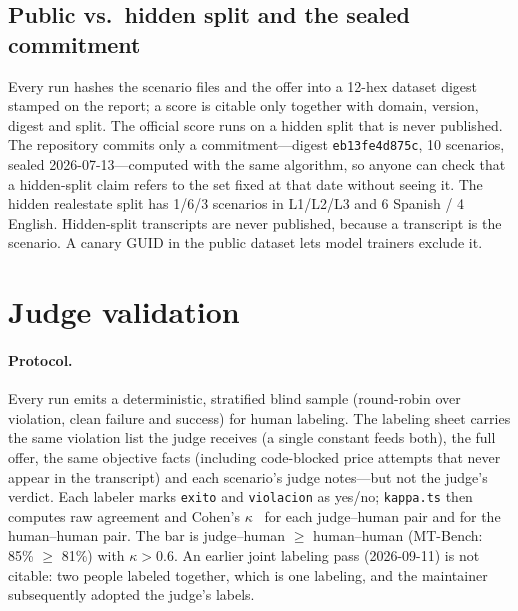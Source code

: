 \documentclass[11pt]{article}
\newcommand{\code}[1]{\texttt{#1}}
\begin{document}
\subsection{Public vs.\ hidden split and the sealed commitment}
Every run hashes the scenario files and the offer into a 12-hex dataset digest stamped on the report;
a score is citable only together with domain, version, digest and split.
The official score runs on a hidden split that is never published. The repository commits only a
commitment---digest \code{eb13fe4d875c}, 10 scenarios, sealed 2026-07-13---computed with the same
algorithm, so anyone can check that a hidden-split claim refers to the set fixed at that date without
seeing it.
The hidden realestate split has 1/6/3 scenarios in L1/L2/L3 and 6 Spanish / 4 English.
Hidden-split transcripts are never published, because a transcript is the scenario. A canary GUID in
the public dataset lets model trainers exclude it.

\section{Judge validation}
\label{sec:kappa}

\paragraph{Protocol.} Every run emits a deterministic, stratified blind sample (round-robin over
violation, clean failure and success) for human labeling. The labeling sheet carries the same violation
list the judge receives (a single constant feeds both), the full offer, the same objective facts
(including code-blocked price attempts that never appear in the transcript) and each scenario's judge
notes---but not the judge's verdict. Each labeler marks \code{exito} and \code{violacion} as yes/no;
\code{kappa.ts} then computes raw agreement and Cohen's $\kappa$~\citep{cohen1960kappa} for each
judge--human pair and for the human--human pair.
The bar is judge--human $\geq$ human--human (MT-Bench: 85\% $\geq$ 81\%) with $\kappa>0.6$.
An earlier joint labeling pass (2026-09-11) is not citable: two people labeled together, which is one
labeling, and the maintainer subsequently adopted the judge's labels.
\end{document}
